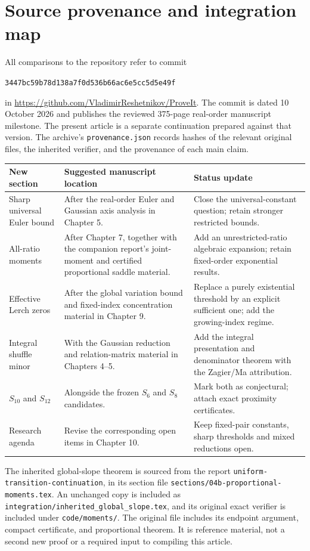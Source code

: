 \documentclass[11pt,letterpaper]{article}
\theoremstyle{definition}
\theoremstyle{remark}
\newcommand{\sourcecommit}{\texttt{3447bc59b78d138a7f0d536b66ac6e5cc5d5e49f}}
\newcommand{\code}[1]{\nolinkurl{#1}}
\begin{document}
\section{Source provenance and integration map}
\label{app:provenance}

All comparisons to the repository refer to commit
\begin{center}\sourcecommit\end{center}
in \url{https://github.com/VladimirReshetnikov/ProveIt}.
The commit is dated 10 October 2026 and publishes the reviewed
375-page real-order manuscript milestone. The present article is a
separate continuation prepared against that version. The archive's
\code{provenance.json} records hashes of the relevant original files,
the inherited verifier, and the provenance of each main claim.

\begin{longtable}{@{}P{0.28\textwidth}P{0.40\textwidth}P{0.26\textwidth}@{}}
\toprule
New section & Suggested manuscript location & Status update\\
\midrule
\endhead
Sharp universal Euler bound & After the real-order Euler and Gaussian
axis analysis in Chapter 5. & Close the universal-constant question;
retain stronger restricted bounds.\\
All-ratio moments & After Chapter 7, together with the companion report's joint-moment and
certified proportional saddle material. & Add an unrestricted-ratio algebraic
expansion; retain fixed-order exponential results.\\
Effective Lerch zeros & After the global variation bound and fixed-index
concentration material in Chapter 9. & Replace a purely existential
threshold by an explicit sufficient one; add the growing-index regime.\\
Integral shuffle minor & With the Gaussian reduction and relation-matrix
material in Chapters 4--5. & Add the integral presentation and denominator
theorem with the Zagier/Ma attribution.\\
$S_{10}$ and $S_{12}$ & Alongside the frozen $S_6$ and $S_8$ candidates. &
Mark both as conjectural; attach exact proximity certificates.\\
Research agenda & Revise the corresponding open items in Chapter 10. &
Keep fixed-pair constants, sharp thresholds and mixed reductions open.\\
\bottomrule
\end{longtable}

The inherited global-slope theorem is sourced from the report
\code{uniform-transition-continuation}, in its section file
\code{sections/04b-proportional-moments.tex}.
An unchanged copy is included as \code{integration/inherited_global_slope.tex},
and its original exact verifier is included under \code{code/moments/}.
The original file includes its endpoint argument, compact certificate,
and proportional theorem. It is reference material, not a second new
proof or a required input to compiling this article.
\end{document}

